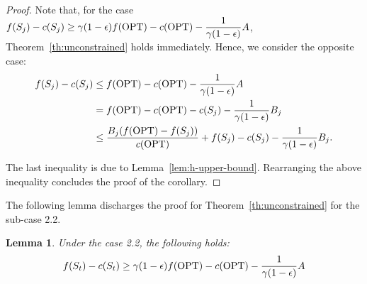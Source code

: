 \documentclass[10pt]{article} %
\newtheorem{lemma}[theorem]{Lemma}
\theoremstyle{remark}
\newcommand{\OPT}{{\rm OPT}}
\begin{document}
\begin{proof}

Note that, for the case $f(S_{j}) -c(S_{j})
            \geq \gamma (1-\epsilon)f(\OPT)-c(\OPT)-\displaystyle\frac{1}{\gamma (1-\epsilon)}A$, Theorem~\ref{th:unconstrained} holds immediately. 
   Hence, we consider the opposite case:
    \begin{align*}
    f(S_{j}) -c(S_{j}) &\leq f(\OPT)-c(\OPT)-\frac{1}{\gamma (1-\epsilon)}A\\
    &=f(\OPT)-c(\OPT)- c(S_{j}) - \frac{1}{\gamma (1-\epsilon)}B_j\\
    &\leq \displaystyle\frac{B_j(f(\OPT) - f(S_{j}))}{c(\OPT)} +f(S_{j}) - c(S_{j}) - \frac{1}{\gamma (1-\epsilon)}B_j .
    \end{align*}
  
    The last inequality is due to Lemma~\ref{lem:h-upper-bound}. 
                Rearranging the above inequality concludes the proof of the corollary.
\end{proof}


The following lemma discharges the proof for Theorem~\ref{th:unconstrained} for the sub-case 2.2. 

\begin{lemma} 
    \label{lem:unconstrained-h_St}
Under the case 2.2,
the following holds:
    \[
    f(S_t)-c(S_t) \geq \gamma(1-\epsilon)f(\OPT)-c(\OPT) - \frac{1}{\gamma(1-\epsilon)}A
    \]
\end{lemma}
\end{document}
